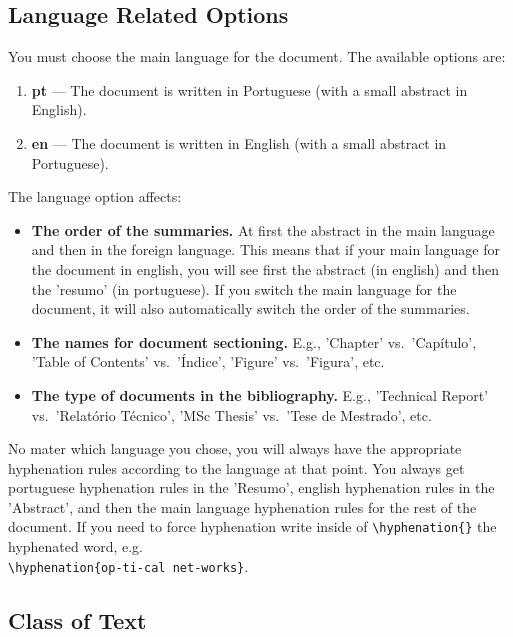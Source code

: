 \subsection{Language Related Options} %
\label{sub:language_related_options}

You must choose the main language for the document. The available options are:

\begin{enumerate}
	\item \textbf{pt} --- The document is written in Portuguese (with a small abstract in English).
	\item \textbf{en} --- The document is written in English (with a small abstract in Portuguese).
\end{enumerate}

The language option affects:
\begin{itemize}
	\item \textbf{The order of the summaries.} At first the abstract in the main language and then in the foreign language. This means that if your main language for the document in english, you will see first the abstract (in english) and then the 'resumo' (in portuguese). If you switch the main language for the document, it will also automatically switch the order of the summaries.
	\item \textbf{The names for document sectioning.} E.g., 'Chapter' vs.\ 'Capítulo', 'Table of Contents' vs.\ 'Índice', 'Figure' vs.\ 'Figura', etc.
	\item \textbf{The type of documents in the bibliography.} E.g., 'Technical Report' vs.\ 'Relatório Técnico', 'MSc Thesis' vs.\ 'Tese de Mestrado', etc.
\end{itemize} 

No mater which language you chose, you will always have the appropriate hyphenation rules according to the language at that point. You always get portuguese hyphenation rules in the 'Resumo', english hyphenation rules in the 'Abstract', and then the main language hyphenation rules for the rest of the document. If you need to force hyphenation write inside of \verb!\hyphenation{}! the hyphenated word, e.g. \\
\verb!\hyphenation{op-ti-cal net-works}!.

\subsection{Class of Text} %
\label{sub:class_of_text}

